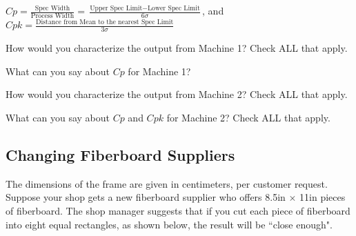 \documentclass{ximera}
\begin{document}
\begin{question}\label{quest:Mach1Mach2}
\begin{hint}
    $Cp=\frac{\text{Spec Width}}{\text{Process Width}}=\frac{\text{Upper Spec Limit}-\text{Lower Spec Limit}}{6\sigma}$, and $Cpk=\frac{\text{Distance from Mean to the nearest Spec Limit}}{3\sigma}$
\end{hint}
How would you characterize the output from Machine 1? Check ALL that apply.

\begin{selectAll}
\end{selectAll}

What can you say about $Cp$ for Machine 1?

\begin{selectAll}
\end{selectAll}

How would you characterize the output from Machine 2? Check ALL that apply.

\begin{selectAll}
\end{selectAll}

What can you say about $Cp$ and $Cpk$ for Machine 2?  Check ALL that apply.

\begin{selectAll}
\end{selectAll}
\end{question}

\subsection*{Changing Fiberboard Suppliers}

The dimensions of the frame are given in centimeters, per customer request. Suppose your shop gets a new fiberboard supplier who offers 8.5in $\times$ 11in pieces of fiberboard.  The shop manager suggests that if you cut each piece of fiberboard into eight equal rectangles, as shown below, the result will be ``close enough".
\end{document}
